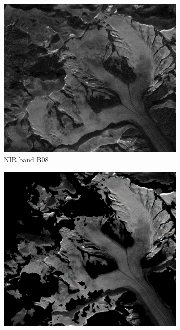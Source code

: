\documentclass[12pt]{article}
\begin{document}
 \begin{figure}[h]
 \centering
       \begin{subfigure}[height=3cm]{0.475\textwidth}
            \centering
            \includegraphics[width=\textwidth]{grosse_aletsch}
            \caption{\small NIR band B08}   
            \label{fig:aletsch_raw}
        \end{subfigure}
        \hfill
        \begin{subfigure}[height=3cm]{0.475\textwidth}  
            \centering 
            \includegraphics[width=\textwidth]{Altesch_masks}

\end{subfigure}
\end{figure}
\end{document}
